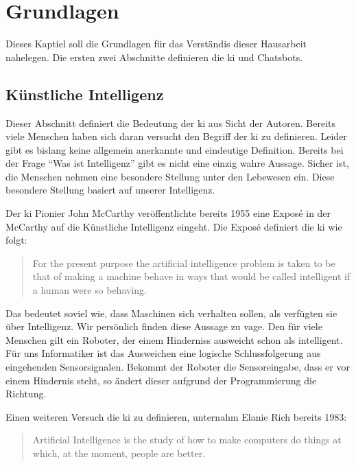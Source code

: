 \section{Grundlagen}
Dieses Kaptiel soll die Grundlagen für das Verständis dieser Hausarbeit nahelegen. Die ersten zwei Abschnitte definieren die \ac{ki} und Chatsbots. 

\subsection{Künstliche Intelligenz}
Dieser Abschnitt definiert die Bedeutung der \ac{ki} aus Sicht der Autoren. Bereits viele Menschen haben sich daran versucht den Begriff der \ac{ki} zu definieren. Leider gibt es bislang keine allgemein anerkannte und eindeutige Definition. Bereits bei der Frage \enquote{Was ist Intelligenz} gibt es nicht eine einzig wahre Aussage. Sicher ist, die Menschen nehmen eine besondere Stellung unter den Lebewesen ein. Diese besondere Stellung basiert auf unserer Intelligenz. 

Der \ac{ki} Pionier John McCarthy veröffentlichte bereits 1955 eine Exposé \cite{PROPOSALMcCarthy} in der McCarthy auf die Künstliche Intelligenz eingeht. Die Exposé definiert die \ac{ki} wie folgt:
\begin{quote}
		For the present purpose the artificial intelligence problem is taken to be that of making a machine behave in ways that would be called intelligent if a human were so behaving.
\end{quote}
Das bedeutet soviel wie, dass Maschinen sich verhalten sollen, als verfügten sie über Intelligenz. Wir persönlich finden diese Aussage zu vage. Den für viele Menschen gilt ein Roboter, der einem Hinderniss ausweicht schon als intelligent. Für uns Informatiker ist das Ausweichen eine logische Schlussfolgerung aus eingehenden Sensorsignalen. Bekommt der Roboter die Sensoreingabe, dass er vor einem Hindernis steht, so ändert dieser aufgrund der Programmierung die Richtung.

Einen weiteren Versuch die \ac{ki} zu definieren, unternahm Elanie Rich \cite{ArtificialIntelligence} bereits 1983: 
\begin{quote}
		Artificial Intelligence is the study of how to make computers do things at which, at the moment, people are better.
\end{quote}

